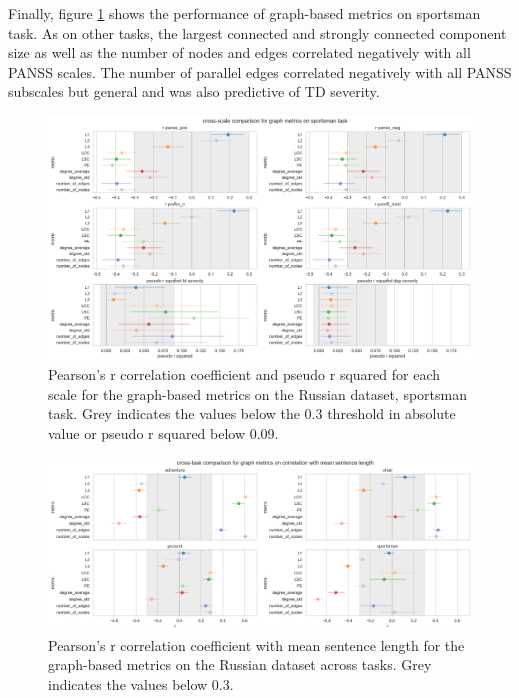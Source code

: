 Finally, figure \ref{fig:results:graph:ru:sp} shows the performance of graph-based metrics on sportsman task. As on other tasks, the largest connected and strongly connected component size as well as the number of nodes and edges correlated negatively with all PANSS scales. The number of parallel edges correlated negatively with all PANSS subscales but general and was also predictive of TD severity.

\begin{figure}[ht!]
    \includegraphics[width=1.1\textwidth, center]{Figures/chapter_4/graph/ru_sportsman_scale_r.png} 
\captionsetup{width=\textwidth}
\caption[Graph Metrics: Russian, Sportsman Task]{\label{fig:results:graph:ru:sp} Pearson's r correlation coefficient and pseudo r squared for each scale for the graph-based metrics on the Russian dataset, sportsman task. Grey indicates the values below the 0.3 threshold in absolute value or pseudo r squared below 0.09.}
\end{figure}


\begin{figure}[ht!]
    \includegraphics[width=1.1\textwidth, center]{Figures/chapter_4/graph/ru_corr_len.png} 
\captionsetup{width=\textwidth}
\caption[Syntactic Metrics: Russian, Length Correlation]{\label{fig:results:graph:ru:corr_len} Pearson's r correlation coefficient with mean sentence length for the graph-based metrics on the Russian dataset across tasks. Grey indicates the values below 0.3.}
\end{figure}

